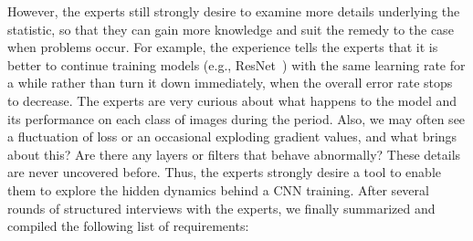 \documentclass[format=acmsmall, review=false, screen=true]{acmart}
\newcommand{\dy}{\textcolor[rgb]{0,0,0}}
\begin{document}
However, the experts still strongly desire to examine more details underlying the statistic, so that they can gain more knowledge and suit the remedy to the case when problems occur.
For example, the experience tells the experts that it is better to continue training models (e.g., ResNet~\cite{he2016deep}) with the same learning rate for a while rather than turn it down immediately, when the overall error rate stops to decrease. The experts are very curious about what happens to the model and its performance on each class of images during the period.
Also, we may often see a fluctuation of loss or an occasional exploding gradient values, and what brings about this? Are there any layers or filters that behave abnormally?
These details are never uncovered before.
Thus, the experts strongly desire a tool to enable them to explore the hidden dynamics behind a CNN training.
After several rounds of structured interviews with the experts, we finally summarized and compiled the following list of requirements:
\end{document}
